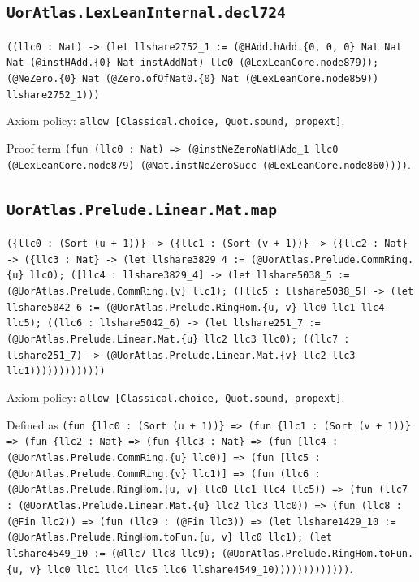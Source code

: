 \documentclass[11pt]{article}
\begin{document}
\subsection*{\texttt{UorAtlas.LexLeanInternal.decl724}}
\noindent\texttt{((llc0 : Nat) -> (let llshare2752\_1 := (@HAdd.hAdd.\{0, 0, 0\} Nat Nat Nat (@instHAdd.\{0\} Nat instAddNat) llc0 (@LexLeanCore.node879)); (@NeZero.\{0\} Nat (@Zero.ofOfNat0.\{0\} Nat (@LexLeanCore.node859)) llshare2752\_1)))}\par
\noindent Axiom policy: \texttt{allow [Classical.choice, Quot.sound, propext]}.\par
\noindent Proof term \texttt{(fun (llc0 : Nat) => (@instNeZeroNatHAdd\_1 llc0 (@LexLeanCore.node879) (@Nat.instNeZeroSucc (@LexLeanCore.node860))))}.\par
\subsection*{\texttt{UorAtlas.Prelude.Linear.Mat.map}}
\noindent\texttt{(\{llc0 : (Sort (u + 1))\} -> (\{llc1 : (Sort (v + 1))\} -> (\{llc2 : Nat\} -> (\{llc3 : Nat\} -> (let llshare3829\_4 := (@UorAtlas.Prelude.CommRing.\{u\} llc0); ([llc4 : llshare3829\_4] -> (let llshare5038\_5 := (@UorAtlas.Prelude.CommRing.\{v\} llc1); ([llc5 : llshare5038\_5] -> (let llshare5042\_6 := (@UorAtlas.Prelude.RingHom.\{u, v\} llc0 llc1 llc4 llc5); ((llc6 : llshare5042\_6) -> (let llshare251\_7 := (@UorAtlas.Prelude.Linear.Mat.\{u\} llc2 llc3 llc0); ((llc7 : llshare251\_7) -> (@UorAtlas.Prelude.Linear.Mat.\{v\} llc2 llc3 llc1)))))))))))))}\par
\noindent Axiom policy: \texttt{allow [Classical.choice, Quot.sound, propext]}.\par
\noindent Defined as \texttt{(fun \{llc0 : (Sort (u + 1))\} => (fun \{llc1 : (Sort (v + 1))\} => (fun \{llc2 : Nat\} => (fun \{llc3 : Nat\} => (fun [llc4 : (@UorAtlas.Prelude.CommRing.\{u\} llc0)] => (fun [llc5 : (@UorAtlas.Prelude.CommRing.\{v\} llc1)] => (fun (llc6 : (@UorAtlas.Prelude.RingHom.\{u, v\} llc0 llc1 llc4 llc5)) => (fun (llc7 : (@UorAtlas.Prelude.Linear.Mat.\{u\} llc2 llc3 llc0)) => (fun (llc8 : (@Fin llc2)) => (fun (llc9 : (@Fin llc3)) => (let llshare1429\_10 := (@UorAtlas.Prelude.RingHom.toFun.\{u, v\} llc0 llc1); (let llshare4549\_10 := (@llc7 llc8 llc9); (@UorAtlas.Prelude.RingHom.toFun.\{u, v\} llc0 llc1 llc4 llc5 llc6 llshare4549\_10)))))))))))))}.\par
\end{document}
